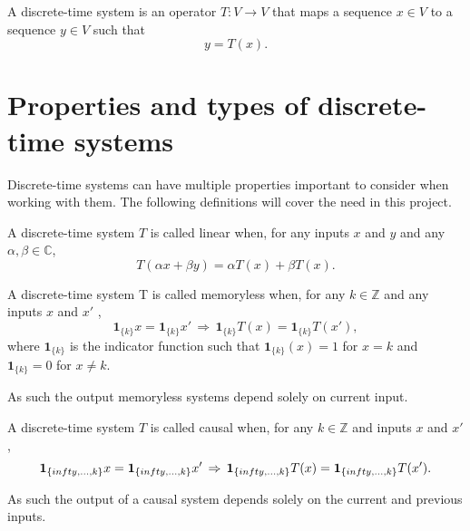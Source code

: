 \begin{definition}\label{def:discrete_time_system}
A discrete-time system is an operator $T:V\to V$ that maps a sequence $x\in V$ to a sequence $y\in V$ such that
\begin{equation}
y=T(x).
\end{equation}
\end{definition}
\section{Properties and types of discrete-time systems}\label{sec:properties_DTS}
Discrete-time systems can have multiple properties important to consider when working with them. The following definitions will cover the need in this project.
\begin{definition}\label{def:linear_system}
A discrete-time system $T$ is called linear when, for any inputs $x$ and $y$ and any $\alpha,\beta\in\mathbb{C}$,
\begin{equation}
T(\alpha x+\beta y)=\alpha T(x)+\beta T(x).
\end{equation}
\end{definition}
\begin{definition}\label{def:memoryless_system}
A discrete-time system T is called memoryless when, for any $k\in\mathbb{Z}$ and any inputs $x$ and $x'$ ,
\begin{equation}
\mathbf{1}_{\{k\}}x=\mathbf{1}_{\{k\}}x'\,\Rightarrow\,\mathbf{1}_{\{k\}}T(x)=\mathbf{1}_{\{k\}}T(x'),
\end{equation}
where $\mathbf{1}_{\{k\}}$ is the indicator function such that $\mathbf{1}_{\{k\}}(x)=1$ for $x=k$ and $\mathbf{1}_{\{k\}}=0$ for $x\neq k$.
\end{definition}
As such the output memoryless systems depend solely on current input.
\begin{definition}\label{def:causal_system}
A discrete-time system $T$ is called causal when, for any $k\in\mathbb{Z}$ and inputs $x$ and $x'$,
\begin{equation}
\mathbf{1}_{\{\-infty,\ldots,k\}}x=\mathbf{1}_{\{\-infty,\ldots,k\}}x'\,\Rightarrow\,\mathbf{1}_{\{\-infty,\ldots,k\}}T(x)=\mathbf{1}_{\{\-infty,\ldots,k\}}T(x').
\end{equation}
\end{definition}
As such the output of a causal system depends solely on the current and previous inputs.
